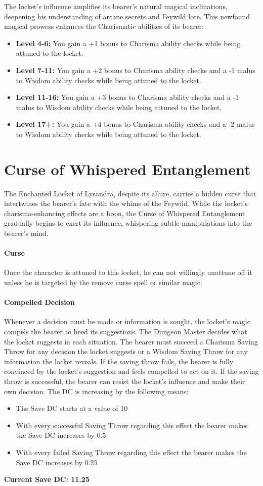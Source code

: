 \documentclass[letterpaper,openany,oneside,twocolumn]{book}
\begin{document}
The locket's influence amplifies its bearer's natural magical inclinations, deepening his understanding of arcane secrets and Feywild lore. This newfound magical prowess enhances the Charismatic abilities of its bearer:
\begin{itemize}
	\item \textbf{Level 4-6:} You gain a +1 bonus to Charisma ability checks while being attuned to the locket.
	\item \textbf{Level 7-11:} You gain a +2 bonus to Charisma ability checks and a -1 malus to Wisdom ability checks while being attuned to the locket.
	\item \textbf{Level 11-16:} You gain a +3 bonus to Charisma ability checks and a -1 malus to Wisdom ability checks while being attuned to the locket.
	\item \textbf{Level 17+:} You gain a +4 bonus to Charisma ability checks and a -2 malus to Wisdom ability checks while being attuned to the locket.
\end{itemize}
\section*{Curse of Whispered Entanglement}
The Enchanted Locket of Lysandra, despite its allure, carries a hidden curse that intertwines the bearer's fate with the whims of the Feywild. While the locket's charisma-enhancing effects are a boon, the Curse of Whispered Entanglement gradually begins to exert its influence, whispering subtle manipulations into the bearer's mind.

\paragraph*{Curse}
Once the character is attuned to this locket, he can not willingly unattune off it unless he is targeted by the remove curse spell or similar magic.

\paragraph{Compelled Decision}
Whenever a decision must be made or information is sought, the locket's magic compels the bearer to heed its suggestions. The Dungeon Master decides what the locket suggests in each situation. The bearer must succeed a Charisma Saving Throw for any decision the locket suggests or a Wisdom Saving Throw for any information the locket reveals. If the saving throw fails, the bearer is fully convinced by the locket's suggestion and feels compelled to act on it. If the saving throw is successful, the bearer can resist the locket's influence and make their own decision. The DC is increasing by the following means:
\begin{itemize}
	\item The Save DC starts at a value of 10
	\item With every successful Saving Throw regarding this effect the bearer makes the Save DC increases by 0.5
	\item With every failed Saving Throw regarding this effect the bearer makes the Save DC increases by 0.25
\end{itemize}
\textbf{Current Save DC: 11.25}
\end{document}
